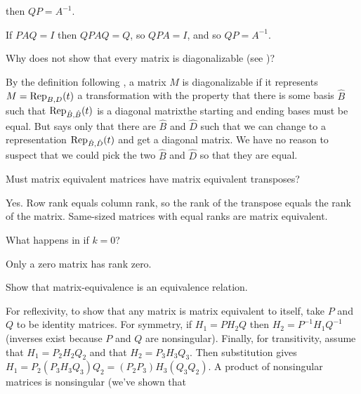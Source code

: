 \begin{exercises}
    then \( QP=A^{-1} \).
    \begin{answer}
      If \( PAQ=I \) then \( QPAQ=Q \), so \( QPA=I \), and so
      \( QP=A^{-1} \).  
    \end{answer}
  \recommended \item
    Why does  not show that every matrix
    is diagonalizable (see )?
    \begin{answer}
      By the definition following  , a matrix
      $M$ is diagonalizable if it represents $M=\rep{t}{B,D}$
      a transformation with the property that there is some basis
      $\hat{B}$ such that $\rep{t}{\hat{B},\hat{B}}$ is a diagonal 
      matrix\Dash the starting and ending bases must be equal. 
      But   says only that there are 
      $\hat{B}$ and $\hat{D}$ such that we can 
      change to a representation $\rep{t}{\hat{B},\hat{D}}$ and get a diagonal
      matrix.
      We have no reason to suspect that we could pick the two
      $\hat{B}$ and $\hat{D}$ so that they are equal.
    \end{answer}
  \item 
    Must matrix equivalent matrices have matrix equivalent transposes?
    \begin{answer}
      Yes.
      Row rank equals column rank, so the rank of the transpose equals
      the rank of the matrix.
      Same-sized matrices with equal ranks are matrix equivalent.  
    \end{answer}
  \item 
    What happens in  if \( k=0 \)?
    \begin{answer}
      Only a zero matrix has rank zero.  
    \end{answer}
  \recommended \item \label{exer:MatEqIsEqRel}
    Show that matrix-equivalence is an equivalence relation.
    \begin{answer}
      For reflexivity, to show that any matrix is matrix equivalent to
      itself, 
      take \( P \) and \( Q \) to be identity matrices.
      For symmetry, if \( H_1=PH_2Q \) then
      \( H_2=P^{-1}H_1Q^{-1} \) (inverses exist because $P$ and $Q$ are
      nonsingular).
      Finally, for transitivity, assume that \( H_1=P_2H_2Q_2 \) and 
      that \( H_2=P_3H_3Q_3 \).
      Then substitution gives 
      \( H_1=P_2(P_3H_3Q_3)Q_2=(P_2P_3)H_3(Q_3Q_2) \).
      A product of nonsingular matrices is nonsingular (we've shown that

\end{answer}
\end{exercises}
